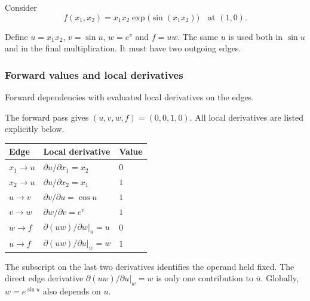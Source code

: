 \clearpage
\begin{example}
Consider
\[
 f(x_1,x_2)=x_1x_2\exp\bigl(\sin(x_1x_2)\bigr)
 \quad\text{at }(1,0).
\]
\end{example}

Define $u=x_1x_2$, $v=\sin u$, $w=e^v$ and $f=uw$. The same $u$ is used both in $\sin u$ and in the final multiplication. It must have two outgoing edges.

\subsubsection*{Forward values and local derivatives}
\begin{center}

\small Forward dependencies with evaluated local derivatives on the edges.
\end{center}
The forward pass gives $(u,v,w,f)=(0,0,1,0)$. All local derivatives are listed explicitly below.
\begin{center}
\renewcommand{\arraystretch}{1.3}
\begin{tabular}{lll}
\toprule
Edge & Local derivative & Value\\
\midrule
$x_1\to u$ & $\partial u/\partial x_1=x_2$ & $0$\\
$x_2\to u$ & $\partial u/\partial x_2=x_1$ & $1$\\
$u\to v$ & $\partial v/\partial u=\cos u$ & $1$\\
$v\to w$ & $\partial w/\partial v=e^v$ & $1$\\
$w\to f$ & $\left.\partial(uw)/\partial w\right|_u=u$ & $0$\\
$u\to f$ & $\left.\partial(uw)/\partial u\right|_w=w$ & $1$\\
\bottomrule
\end{tabular}
\end{center}
The subscript on the last two derivatives identifies the operand held fixed. The direct edge derivative $\left.\partial(uw)/\partial u\right|_w=w$ is only one contribution to $\bar u$. Globally, $w=e^{\sin u}$ also depends on $u$.

